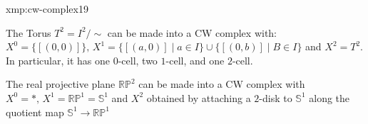 \documentclass[landscape, 8pt]{extarticle}
\begin{document}
\begin{multicols*}{3}
\begin{xmp}{xmp:cw-complex}{19}
	\begin{enumerate-zero}
	    \item The Torus $T^{2} = I^{2} / \sim$ can be made into a CW complex with: $X^{0} = \{[(0,0)]\},\, X^{1} = \{[(a, 0)] \mid a\in I\} \cup \{[(0, b)] \mid B \in I\}$ and $X^{2} = T^{2}$. In particular, it has one $0$-cell, two $1$-cell, and one $2$-cell.
		\item The real projective plane $\mathbb{RP}^{2}$ can be made into a CW complex with $X^{0} = \ast,\, X^{1} = \mathbb{RP}^{1} = \mathbb{S}^{1}$ and $X^{2}$ obtained by attaching a $2$-disk to $\mathbb{S}^{1}$ along the quotient map $\mathbb{S}^{1} \to \mathbb{RP}^{1}$
	\end{enumerate-zero}
\end{xmp}

\newpage

\end{multicols*}
\end{document}
